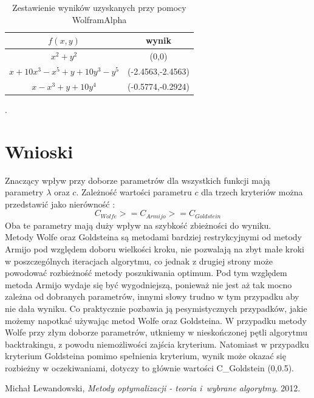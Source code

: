 \documentclass{classrep}
\begin{document}
	
	\begin{table}[H]
		\begin{center}
\begin{tabular}{|c|c|}
\hline $f(x,y)$ & wynik \\ 
\hline $x^2+y^2$ & (0,0) \\ 
\hline $x+10x^3-x^5 +y+10y^3-y^5$ & (-2.4563,-2.4563) \\ 
\hline $x-x^3 +y+10y^4$ & (-0.5774,-0.2924) \\ 
\hline 
\end{tabular} 
			\caption{Zestawienie wyników uzyskanych przy pomocy WolframAlpha }.
		\end{center}
\end{table}


\section{Wnioski}
Znaczący wpływ przy doborze parametrów dla wszystkich funkcji mają parametry $\lambda$ oraz $c$. Zależność wartości parametru $c$ dla trzech kryteriów można przedstawić jako nierówność :
\begin{equation}
C_{Wolfe} >= C_{Armijo} >= C_{Goldstein}
\end{equation}
Oba te parametry mają duży wpływ na szybkość zbieżności do wyniku.\\
Metody Wolfe oraz Goldsteina są metodami bardziej restrykcyjnymi od metody Armijo pod względem doboru wielkości kroku, nie pozwalają na zbyt małe kroki w poszczególnych iteracjach algorytmu, co jednak z drugiej strony może powodować rozbieżność metody poszukiwania optimum. Pod tym względem metoda Armijo wydaje się być wygodniejszą, ponieważ nie jest aż tak mocno zależna od dobranych parametrów, innymi słowy trudno w tym przypadku aby nie dała wyniku. Co praktycznie pozbawia ją pesymistycznych przypadków, jakie możemy napotkać używając metod Wolfe oraz Goldsteina. W przypadku metody Wolfe przy złym doborze parametrów, utkniemy w nieskończonej pętli algorytmu backtrakingu, z powodu niemożliwości zajścia kryterium. Natomiast w przypadku kryterium Goldsteina pomimo spełnienia kryterium, wynik może okazać się rozbieżny w oczekiwaniami, dotyczy to głównie wartości C_{Goldstein} \notin (0,0.5).


\begin{thebibliography}{9}
	Michał Lewandowski,  \emph{Metody optymalizacji - teoria i~wybrane algorytmy}.  2012.
\end{thebibliography}
\end{document}
